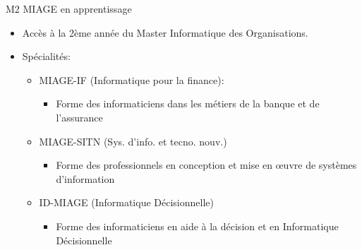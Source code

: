 \documentclass[minimal,compress]{beamer}
\begin{document}
\begin{frame}{M2 MIAGE en apprentissage}

\begin{itemize}
\item Accès à la \alert{2ème année} du Master Informatique des Organisations.
\item Spécialités:
\begin{itemize}
\item \alert{MIAGE-IF} (Informatique pour la finance):
\begin{itemize}
\item Forme des informaticiens dans les métiers de la \alert{banque et de l’assurance}
\end{itemize}
\item \alert{MIAGE-SITN} (Sys. d’info. et tecno. nouv.)
\begin{itemize}
\item Forme des professionnels en conception et mise en œuvre de \alert{systèmes d’information}
\end{itemize}
\item \alert{ID-MIAGE} (Informatique Décisionnelle)
\begin{itemize}
\item Forme des informaticiens en \alert{aide à la décision et en Informatique Décisionnelle}
\end{itemize}
\end{itemize}
\end{itemize}

\end{frame}





\end{document}

